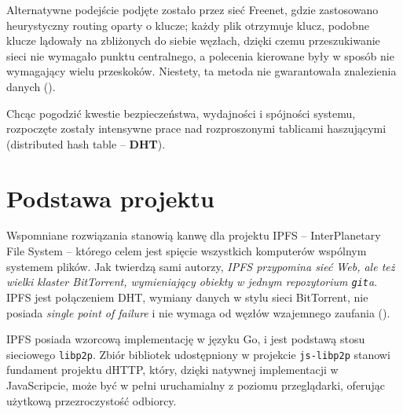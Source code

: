 Alternatywne podejście podjęte zostało przez sieć Freenet, gdzie zastosowano heurystyczny routing oparty o klucze; każdy plik otrzymuje klucz, podobne klucze lądowały na zbliżonych do siebie węzłach, dzięki czemu przeszukiwanie sieci nie wymagało punktu centralnego, a polecenia kierowane były w sposób nie wymagający wielu przeskoków. Niestety, ta metoda nie gwarantowała znalezienia danych (\cite{searchingInSmallWorld}).

Chcąc pogodzić kwestie bezpieczeństwa, wydajności i spójności systemu, rozpoczęte zostały intensywne prace nad rozproszonymi tablicami haszującymi (distributed hash table -- \textbf{DHT}).

\section{Podstawa projektu}
\label{sec:podstawaProjektu}
Wspomniane rozwiązania stanowią kanwę dla projektu IPFS -- InterPlanetary File System -- którego celem jest spięcie wszystkich komputerów wspólnym systemem plików. Jak twierdzą sami autorzy, {\em IPFS przypomina sieć Web, ale też wielki klaster BitTorrent, wymieniający obiekty w jednym repozytorium \texttt{git}a}. IPFS jest połączeniem DHT, wymiany danych w stylu sieci BitTorrent,
nie posiada {\em single point of failure} i nie wymaga od węzłów wzajemnego zaufania (\cite{ipfsWP}).

IPFS posiada wzorcową implementację w języku Go, i jest podstawą stosu sieciowego \texttt{libp2p}. Zbiór bibliotek udostępniony w projekcie \texttt{js-libp2p} stanowi fundament projektu dHTTP, który, dzięki natywnej implementacji w JavaScripcie, może być w pełni uruchamialny z poziomu przeglądarki, oferując użytkową przezroczystość odbiorcy.